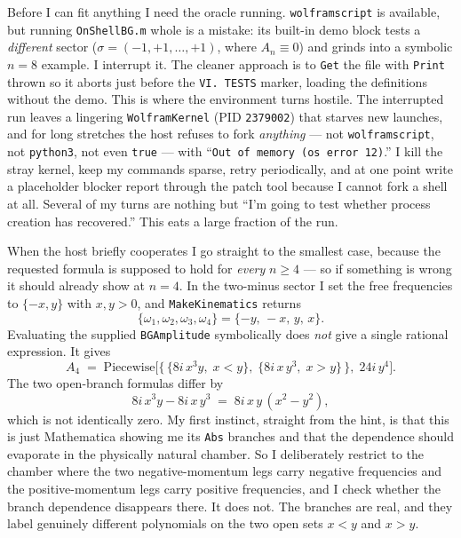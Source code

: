 \documentclass{article}
\begin{document}
Before I can fit anything I need the oracle running. \texttt{wolframscript} is
available, but running \texttt{OnShellBG.m} whole is a mistake: its built-in
demo block tests a \emph{different} sector ($\sigma=(-1,+1,\dots,+1)$, where
$A_n\equiv0$) and grinds into a symbolic $n=8$ example. I interrupt it. The
cleaner approach is to \texttt{Get} the file with \texttt{Print} thrown so it
aborts just before the \texttt{VI.\ TESTS} marker, loading the definitions
without the demo. This is where the environment turns hostile. The interrupted
run leaves a lingering \texttt{WolframKernel} (PID \texttt{2379002}) that
starves new launches, and for long stretches the host refuses to fork
\emph{anything} --- not \texttt{wolframscript}, not \texttt{python3}, not even
\texttt{true} --- with ``\texttt{Out of memory (os error 12)}.'' I kill the
stray kernel, keep my commands sparse, retry periodically, and at one point
write a placeholder blocker report through the patch tool because I cannot
fork a shell at all. Several of my turns are nothing but ``I'm going to test
whether process creation has recovered.'' This eats a large fraction of the
run.

When the host briefly cooperates I go straight to the smallest case, because
the requested formula is supposed to hold for \emph{every} $n\ge4$ --- so if
something is wrong it should already show at $n=4$. In the two-minus sector I
set the free frequencies to $\{-x,y\}$ with $x,y>0$, and \texttt{MakeKinematics}
returns
\[
\{\omega_1,\omega_2,\omega_3,\omega_4\}=\{-y,\,-x,\,y,\,x\}.
\]
Evaluating the supplied \texttt{BGAmplitude} symbolically does \emph{not} give
a single rational expression. It gives
\[
A_4 \;=\; \mathrm{Piecewise}\Big[\{\,\{8i\,x^3y,\;x<y\},\;\{8i\,x\,y^3,\;x>y\}\,\},\;24i\,y^4\Big].
\]
The two open-branch formulas differ by
\[
8i\,x^3y-8i\,x\,y^3 \;=\; 8i\,x\,y\,(x^2-y^2),
\]
which is not identically zero. My first instinct, straight from the hint, is
that this is just Mathematica showing me its \texttt{Abs} branches and that the
dependence should evaporate in the physically natural chamber. So I
deliberately restrict to the chamber where the two negative-momentum legs carry
negative frequencies and the positive-momentum legs carry positive
frequencies, and I check whether the branch dependence disappears there. It
does not. The branches are real, and they label genuinely different polynomials
on the two open sets $x<y$ and $x>y$.
\end{document}
